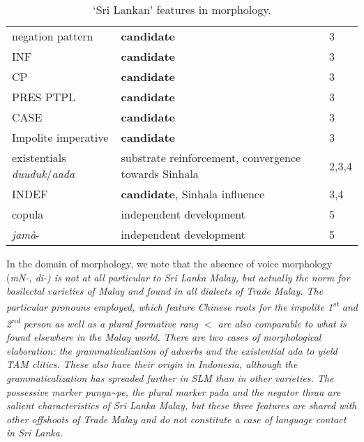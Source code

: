 \begin{table}[h!]
\begin{tabular}{p{4cm}p{4cm}p{2cm}l}
 negation pattern   	& \textbf{candidate}  &\tiny \citet[588-590]{Nordhoff2009} & 3 \\
  INF & \textbf{candidate} &\tiny \citet[244-245]{Nordhoff2009} &  3 \\
  CP & \textbf{candidate}  &\tiny \citet[241-243]{Nordhoff2009}&  3 \\
  PRES PTPL & \textbf{candidate}  &\tiny \citet[358-359]{Nordhoff2009}&  3 \\
  CASE & \textbf{candidate} & \tiny \citet[285-313]{Nordhoff2009}&  3 \\
  Impolite imperative &  \textbf{candidate}  &\tiny \citet[265-266]{Nordhoff2009} & 3 \\
\hline
existentials \emph{duuduk}/\emph{aada}& substrate reinforcement, convergence towards Sinhala & \tiny \citet[142-146]{Nordhoff2009} & 2,3,4\\	
 INDEF  		& \textbf{candidate}, Sinhala influence & \tiny \citet[278-282]{Nordhoff2009}& 3,4 \\
\hline
 copula  		& independent development  &\tiny \citet{Nordhoff2011copula} &  5 \\
 \emph{jamà}- 			& independent development & \tiny \citet[245-247]{Nordhoff2009} &  5 \\
\end{tabular}
\caption{`Sri Lankan' features in morphology.}
\label{tab:morphology}
\end{table}

In the domain of morphology, we note that the absence of voice morphology (\em m\E{}N-, di-\em) is not at all particular to Sri Lanka Malay, but actually the norm for basilectal varieties of Malay and found in all dialects of Trade Malay.
The particular pronouns employed, which feature Chinese roots for the impolite 1\textsuperscript{st} and 2\textsuperscript{nd} person as well as a plural formative \em rang \em $<$  are also comparable to what is found elsewhere in the Malay world. There are two cases of morphological elaboration: the grammaticalization of adverbs and the existential \em ada \em to yield TAM clitics. These also have their origin in Indonesia, although the grammaticalization has spreaded further in SLM than in other varieties. The possessive marker \em punya\~{}pe\em, the plural marker \em pada \em and the negator \em thraa \em are salient characteristics of Sri Lanka Malay, but these three features are shared with other offshoots of Trade Malay and do not constitute a case of language contact in Sri Lanka.

